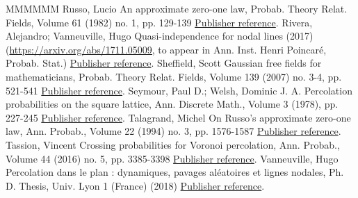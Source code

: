 \documentclass[11pt]{article}
\theoremstyle{definition}
\numberwithin{equation}{section}
\begin{document}
\begin{thebibliography}{MMMMMM}
 Russo, Lucio An approximate zero-one law, Probab. Theory Relat. Fields, Volume 61 (1982) no. 1, pp. 129-139 \href{https://ahl.centre-mersenne.org/item/AHL_2020__3__169_0/#russo1982approximate}{Publisher reference}.
 Rivera, Alejandro; Vanneuville, Hugo Quasi-independence for nodal lines (2017) (\url{https://arxiv.org/abs/1711.05009,} to appear in Ann. Inst. Henri Poincaré, Probab. Stat.) \href{https://ahl.centre-mersenne.org/item/AHL_2020__3__169_0/#rv_rsw}{Publisher reference}.
 Sheffield, Scott Gaussian free fields for mathematicians, Probab. Theory Relat. Fields, Volume 139 (2007) no. 3-4, pp. 521-541 \href{https://ahl.centre-mersenne.org/item/AHL_2020__3__169_0/#shef_gff}{Publisher reference}.
 Seymour, Paul D.; Welsh, Dominic J. A. Percolation probabilities on the square lattice, Ann. Discrete Math., Volume 3 (1978), pp. 227-245 \href{https://ahl.centre-mersenne.org/item/AHL_2020__3__169_0/#seymour1978percolation}{Publisher reference}.
 Talagrand, Michel On Russo’s approximate zero-one law, Ann. Probab., Volume 22 (1994) no. 3, pp. 1576-1587 \href{https://ahl.centre-mersenne.org/item/AHL_2020__3__169_0/#talagrand1994russo}{Publisher reference}.
 Tassion, Vincent Crossing probabilities for Voronoi percolation, Ann. Probab., Volume 44 (2016) no. 5, pp. 3385-3398 \href{https://ahl.centre-mersenne.org/item/AHL_2020__3__169_0/#tassion2014crossing}{Publisher reference}.
 Vanneuville, Hugo Percolation dans le plan : dynamiques, pavages aléatoires et lignes nodales, Ph. D. Thesis, Univ. Lyon 1 (France) (2018) \href{https://ahl.centre-mersenne.org/item/AHL_2020__3__169_0/#hugogogo}{Publisher reference}.
\end{thebibliography}
\end{document}
